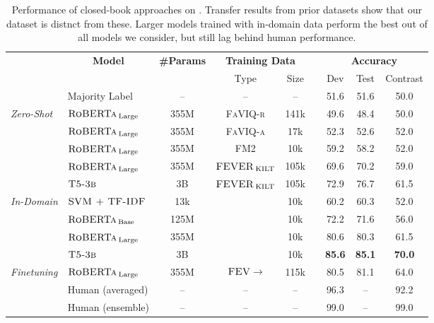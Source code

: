 \renewcommand{\arraystretch}{1}
\begin{table*}[t]
	\centering
	\small
		\caption{Performance of closed-book approaches on \oursno. Transfer results from prior datasets show that our dataset is distnct from these. Larger models trained with in-domain data perform the best out of all models we consider, but still lag behind human performance.}
	\setlength{\tabcolsep}{4pt}
	\begin{tabular}{l l c c c c c c c}
		\toprule
		\multicolumn{1}{c}{\multirow{2}{*}{}} & \multicolumn{1}{c}{\multirow{2}{*}{\textbf{Model}}}  & \multicolumn{1}{c}{\multirow{2}{*}{\textbf{\#Params}}} & \multicolumn{2}{c}{\textbf{Training Data}} &&  \multicolumn{3}{c}{\multirow{1}{*}{\textbf{Accuracy}}}\\
		& \multicolumn{1}{c}{} & \multicolumn{1}{c}{} & \multicolumn{1}{c}{Type} &  \multicolumn{1}{c}{Size} && \multicolumn{1}{c}{Dev}  & \multicolumn{1}{c}{Test} & \multicolumn{1}{c}{Contrast}\\
		\midrule
		& Majority Label & -- & -- & -- && 51.6 & 51.6  & 50.0 \\ 
		\midrule
		\multirow{5}{*}{\textit{Zero-Shot}} & $\textsc{RoBERTa}_{\:\text{Large}}$  & 355M & \textsc{FaVIQ-r} & 141k && 49.6 & 48.4 & 50.0  \\
		& $\textsc{RoBERTa}_{\:\text{Large}}$ & 355M & \textsc{FaVIQ-a} & 17k && 52.3 & 52.6 & 52.0 \\
		& $\textsc{RoBERTa}_{\:\text{Large}}$ & 355M & \textsc{FM2} & 10k && 59.2  & 58.2 & 52.0 \\
        & $\textsc{RoBERTa}_{\:\text{Large}}$ & 355M & $\textsc{FEVER}_{\:\text{KILT}}$ & 105k && 69.6 & 70.2  & 59.0  \\
		& $\textsc{T5-3b}$ & 3B & $\textsc{FEVER}_{\:\text{KILT}}$ & 105k && 72.9 & 76.7 & 61.5  \\
		\midrule
		\multirow{4}{*}{\textit{In-Domain}} & $\textsc{SVM + TF-IDF}$ & 13k & \textsc{\ours} & 10k && 60.2 & 60.3  & 52.0 \\
		& $\textsc{RoBERTa}_{\:\text{Base}}$ & 125M & \textsc{\ours} & 10k && 72.2 & 71.6 & 56.0 \\
		& $\textsc{RoBERTa}_{\:\text{Large}}$ & 355M & \textsc{\ours} & 10k && 80.6 & 80.3 & 61.5 \\
		& $\textsc{T5-3b}$ & 3B & \textsc{\ours} & 10k && \textbf{85.6} & \textbf{85.1} & \textbf{70.0} \\
		\midrule
		\multirow{1}{*}{\textit{Finetuning}} & $\textsc{RoBERTa}_{\:\text{Large}}$ & 355M & 
		$\textsc{FEV} \rightarrow$ \textsc{\ours} & 115k && 80.5 & 81.1 &  64.0  \\
		\midrule
		& Human (averaged)  & -- & -- & -- && 96.3 & --  & 92.2 \\  
		& Human (ensemble)  & -- & -- & -- && 99.0 & --  & 99.0 \\  
		\bottomrule 
	\end{tabular} \label{tab:main_result}
\end{table*}

